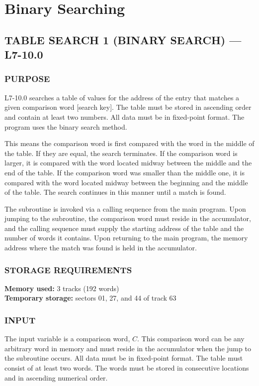 \section{Binary Searching}
\subsection*{TABLE SEARCH 1 (BINARY SEARCH) --- L7-10.0}

\subsubsection*{PURPOSE}
L7-10.0 searches a table of values for the address of the entry that matches a given comparison word [search key]. The table must be stored in ascending order and contain at least two numbers. All data must be in fixed-point format. The program uses the binary search method.

This means the comparison word is first compared with the word in the middle of the table. If they are equal, the search terminates. If the comparison word is larger, it is compared with the word located midway between the middle and the end of the table. If the comparison word was smaller than the middle one, it is compared with the word located midway between the beginning and the middle of the table. The search continues in this manner until a match is found.

The subroutine is invoked via a calling sequence from the main program. Upon jumping to the subroutine, the comparison word must reside in the accumulator, and the calling sequence must supply the starting address of the table and the number of words it contains. Upon returning to the main program, the memory address where the match was found is held in the accumulator.

\subsubsection*{STORAGE REQUIREMENTS}
\textbf{Memory used:} 3 tracks (192 words) \\
\textbf{Temporary storage:} sectors 01, 27, and 44 of track 63

\subsubsection*{INPUT}
The input variable is a comparison word, $C$. This comparison word can be any arbitrary word in memory and must reside in the accumulator when the jump to the subroutine occurs. All data must be in fixed-point format. The table must consist of at least two words. The words must be stored in consecutive locations and in ascending numerical order.

